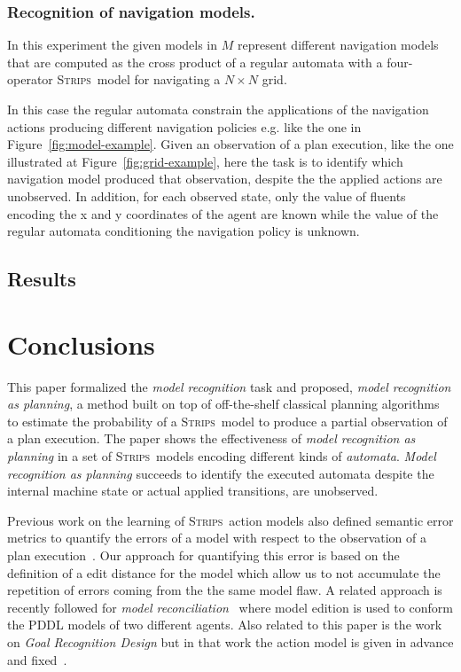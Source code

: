 \documentclass[letterpaper]{article} %
\newcommand{\strips}{\textsc{Strips}}     %
\begin{document}
\subsubsection{Recognition of navigation models.} In this experiment the given models in $M$ represent different navigation models that are computed as the cross product of a regular automata with a four-operator \strips\ model for navigating a $N\times N$ grid.

In this case the regular automata constrain the applications of the navigation actions producing different navigation policies e.g. like the one in Figure~\ref{fig:model-example}. Given an observation of a plan execution, like the one illustrated at Figure~\ref{fig:grid-example}, here the task is to identify which navigation model produced that observation, despite the the applied actions are unobserved. In addition, for each observed state, only the value of fluents encoding the x and y coordinates of the agent are known while the value of the regular automata conditioning the navigation policy is unknown.

\subsection{Results}




\section{Conclusions}
\label{sec:conclussions}
This paper formalized the {\em model recognition} task and proposed, {\em model recognition as planning}, a method built on top of off-the-shelf classical planning algorithms to estimate the probability of a \strips\ model to produce a partial observation of a plan execution. The paper shows the effectiveness of {\em model recognition as planning} in a set of \strips\ models encoding different kinds of {\em automata}. {\em Model recognition as planning} succeeds to identify the executed automata despite the internal machine state or actual applied transitions, are unobserved.

Previous work on the learning of \strips\ action models also defined semantic error metrics to quantify the errors of a model with respect to the observation of a plan execution~\cite{yang2007learning}. Our approach for quantifying this error is based on the definition of a edit distance for the model which allow us to not accumulate the repetition of errors coming from the the same model flaw. A related approach is recently followed for {\em model reconciliation}~\cite{ChakrabortiSZK17} where model edition is used to conform the PDDL models of two different agents. Also  related to this paper is the work on {\em Goal Recognition Design} but in that work the action model is given in advance and fixed~\cite{KerenGK14}.
\end{document}
